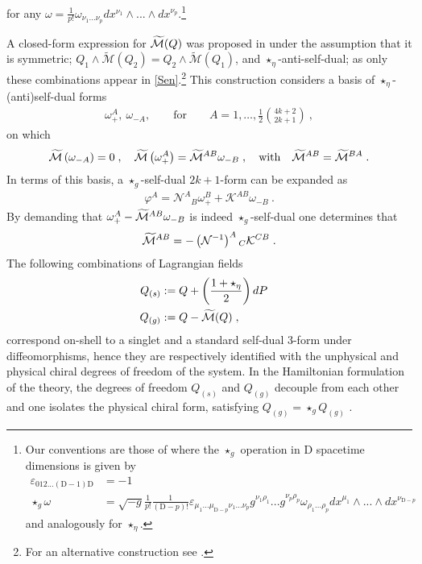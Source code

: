 \documentclass[11pt]{article}
\numberwithin{equation}{section}
\begin{document}
for any $\omega=\frac{1}{p!}\omega_{\nu_1...\nu_p}dx^{\nu_1}\wedge...\wedge dx^{\nu_p}$.\footnote{Our conventions are those of \cite{Andriolo:2020ykk} where the $\star_g$ operation in D spacetime dimensions is given by
\begin{align*}
\varepsilon_{012...(\mathrm{D}-1)\mathrm{D}}&=-1\\
 \star_g \omega&=\sqrt{-g}\frac{1}{p!}\frac{1}{(\mathrm{D}-p)!} \varepsilon_{\mu_1...\mu_{\mathrm{D}-p}\nu_1...\nu_p}g^{\nu_1\rho_1}...g^{\nu_p\rho_p}  \omega_{\rho_1...\rho_p}dx^{\mu_1}\wedge...\wedge dx^{\nu_{\mathrm{D}-p}}
\end{align*}
and analogously for $\star_\eta$.} 

A closed-form expression for $\widetilde{ {\cal M}}(Q)$ was proposed in \cite{Andriolo:2020ykk} under the assumption that it is symmetric; $Q_{1} \wedge \widetilde{\mathcal{M}}\left(Q_{2}\right)=Q_{2} \wedge \widetilde{\mathcal{M}}\left(Q_{1}\right)$, and $\star_\eta$-anti-self-dual; as only these combinations appear in \eqref{Sen}.\footnote{For an alternative construction see \cite{Vanichchapongjaroen:2020wza}.} This construction considers a basis of $\star_\eta$-(anti)self-dual forms
\begin{align}\label{selfdualbasis}
    \omega^A_+, \     \omega_{-A},\qquad \mathrm{for} \qquad A = 1,\ldots,\frac{1}{2}\binom{4k+2}{2k+1}\ ,
\end{align}
on which
\begin{align}
    \widetilde{ {\cal M}}\left(\omega_{-A}\right)=0\;, \quad\widetilde{ {\cal M}}\left(\omega_{+}^{A}\right)=\widetilde{ {\cal M}}^{A B} \omega_{-B}\;,\quad \mathrm{with}\quad \widetilde{ {\cal M}}^{AB} = \widetilde{ {\cal M}}^{BA}\;.
\end{align}
In terms of this basis, a $\star_g$-self-dual $2k+1$-form can be expanded as
\begin{align}
    \varphi^{A}=\mathcal{N}^{A}{ }_{B} \omega_{+}^{B}+\mathcal{K}^{A B} \omega_{-B}\ .
\end{align}
By demanding that $\omega_{+}^{A}-\widetilde{ {\cal M}}^{A B} \omega_{-B}$ is indeed $\star_g$-self-dual one determines that
\begin{align}\label{Mform}
\widetilde{ {\cal M}}^{A B}=-\left(\mathcal{N}^{-1}\right)^{A}{ }_{C} \mathcal{K}^{C B}\;.
\end{align}
The following combinations of Lagrangian fields
\begin{align}\label{sandg}
Q_{(s)} &:=Q+\left(\frac{1+\star_{\eta}}{2}\right) d P \cr
Q_{(g)} &:=Q-\widetilde{ {\cal M}}(Q)\;,
\end{align}
correspond on-shell to a singlet and a standard self-dual 3-form under diffeomorphisms, hence they are respectively identified with the unphysical and physical chiral degrees of freedom of the system. In the Hamiltonian formulation of the theory, the degrees of freedom $Q_{(s)}$ and $Q_{(g)}$  decouple from each other and one isolates the physical chiral form, satisfying $Q_{(g)}=\star_g Q_{(g)}$  \cite{Sen:2019qit,Andriolo:2020ykk}. 
\end{document}
